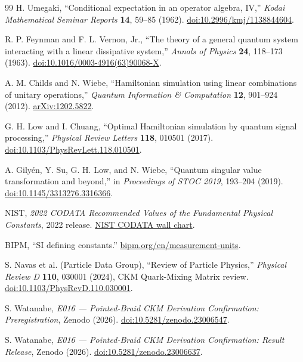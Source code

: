 \documentclass[11pt]{article}
\theoremstyle{definition}
\theoremstyle{remark}
\begin{document}
\begin{thebibliography}{99}
H. Umegaki, ``Conditional expectation in an operator algebra, IV,'' \emph{Kodai Mathematical Seminar Reports} \textbf{14}, 59--85 (1962). \href{https://doi.org/10.2996/kmj/1138844604}{doi:10.2996/kmj/1138844604}.

R. P. Feynman and F. L. Vernon, Jr., ``The theory of a general quantum system interacting with a linear dissipative system,'' \emph{Annals of Physics} \textbf{24}, 118--173 (1963). \href{https://doi.org/10.1016/0003-4916(63)90068-X}{doi:10.1016/0003-4916(63)90068-X}.

A. M. Childs and N. Wiebe, ``Hamiltonian simulation using linear combinations of unitary operations,'' \emph{Quantum Information \& Computation} \textbf{12}, 901--924 (2012). \href{https://arxiv.org/abs/1202.5822}{arXiv:1202.5822}.

G. H. Low and I. Chuang, ``Optimal Hamiltonian simulation by quantum signal processing,'' \emph{Physical Review Letters} \textbf{118}, 010501 (2017). \href{https://doi.org/10.1103/PhysRevLett.118.010501}{doi:10.1103/PhysRevLett.118.010501}.

A. Gily\'en, Y. Su, G. H. Low, and N. Wiebe, ``Quantum singular value transformation and beyond,'' in \emph{Proceedings of STOC 2019}, 193--204 (2019). \href{https://doi.org/10.1145/3313276.3316366}{doi:10.1145/3313276.3316366}.

NIST, \emph{2022 CODATA Recommended Values of the Fundamental Physical Constants}, 2022 release. \href{https://www.physics.nist.gov/cuu/pdf/wall_2022.pdf}{NIST CODATA wall chart}.

BIPM, ``SI defining constants.'' \href{https://www.bipm.org/en/measurement-units}{bipm.org/en/measurement-units}.

S. Navas et al. (Particle Data Group), ``Review of Particle Physics,'' \emph{Physical Review D} \textbf{110}, 030001 (2024), CKM Quark-Mixing Matrix review. \href{https://doi.org/10.1103/PhysRevD.110.030001}{doi:10.1103/PhysRevD.110.030001}.

S. Watanabe, \emph{E016 --- Pointed-Braid CKM Derivation Confirmation: Preregistration}, Zenodo (2026). \href{https://doi.org/10.5281/zenodo.23006547}{doi:10.5281/zenodo.23006547}.

S. Watanabe, \emph{E016 --- Pointed-Braid CKM Derivation Confirmation: Result Release}, Zenodo (2026). \href{https://doi.org/10.5281/zenodo.23006637}{doi:10.5281/zenodo.23006637}.


\end{thebibliography}
\end{document}
